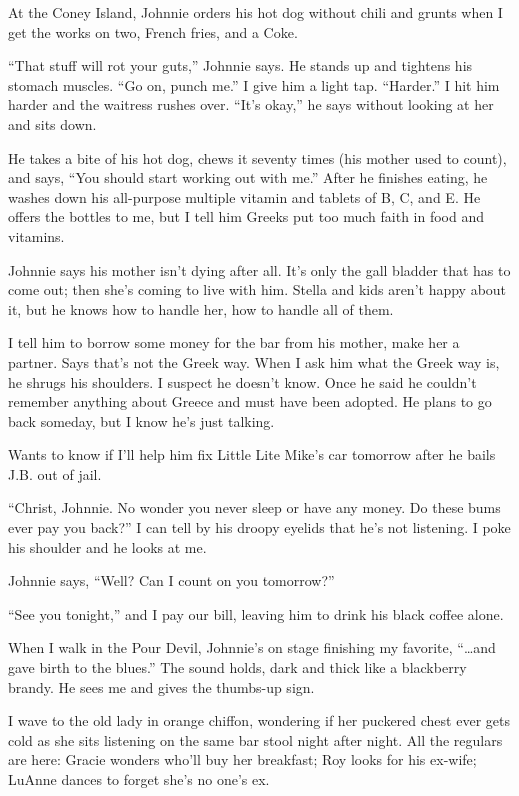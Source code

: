 \documentclass[
]{article}
\begin{document}
At the Coney Island, Johnnie orders his hot dog without chili and grunts
when I get the works on two, French fries, and a Coke.

``That stuff will rot your guts,'' Johnnie says. He stands up and
tightens his stomach muscles. ``Go on, punch me.'' I give him a light
tap. ``Harder.'' I hit him harder and the waitress rushes over. ``It's
okay,'' he says without looking at her and sits down.

He takes a bite of his hot dog, chews it seventy times (his mother used
to count), and says, ``You should start working out with me.'' After he
finishes eating, he washes down his all-purpose multi­ple vitamin and
tablets of B, C, and E. He offers the bottles to me, but I tell him
Greeks put too much faith in food and vitamins.

Johnnie says his mother isn't dying after all. It's only the gall
bladder that has to come out; then she's coming to live with him. Stella
and kids aren't happy about it, but he knows how to handle her, how to
handle all of them.

I tell him to borrow some money for the bar from his mother, make her a
partner. Says that's not the Greek way. When I ask him what the Greek
way is, he shrugs his shoulders. I suspect he doesn't know. Once he said
he couldn't remember anything about Greece and must have been adopted.
He plans to go back someday, but I know he's just talking.

Wants to know if I'll help him fix Little Lite Mike's car tomorrow after
he bails J.B. out of jail.

``Christ, Johnnie. No wonder you never sleep or have any money. Do these
bums ever pay you back?'' I can tell by his droopy eyelids that he's not
listening. I poke his shoulder and he looks at me.

Johnnie says, ``Well? Can I count on you tomorrow?''

``See you tonight,'' and I pay our bill, leaving him to drink his black
coffee alone.

When I walk in the Pour Devil, Johnnie's on stage finishing my favorite,
``\ldots and gave birth to the blues.'' The sound holds, dark and thick
like a blackberry brandy. He sees me and gives the thumbs-up sign.

I wave to the old lady in orange chiffon, wondering if her puckered
chest ever gets cold as she sits listening on the same bar stool night
after night. All the regulars are here: Gracie wonders who'll buy her
breakfast; Roy looks for his ex-wife; LuAnne dances to forget she's no
one's ex.
\end{document}
